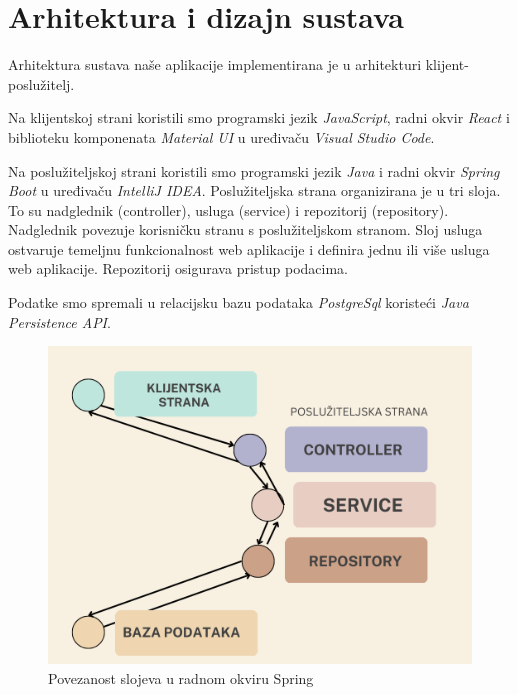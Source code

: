 \chapter{Arhitektura i dizajn sustava}
      
      {Arhitektura sustava naše aplikacije implementirana je u arhitekturi klijent-poslužitelj.}
       
      {Na klijentskoj strani koristili smo programski jezik \textit{JavaScript}, radni okvir \textit{React} i biblioteku komponenata \textit{Material UI} u uređivaču \textit{Visual Studio Code}.}
      
      {Na poslužiteljskoj strani koristili smo programski jezik \textit{Java} i radni okvir \textit{Spring Boot} u uređivaču \textit{IntelliJ IDEA}. Poslužiteljska strana organizirana je u tri sloja. To su nadglednik (controller), usluga (service) i repozitorij (repository). Nadglednik povezuje korisničku stranu s poslužiteljskom stranom. Sloj usluga ostvaruje temeljnu funkcionalnost web aplikacije i definira jednu ili više usluga web aplikacije. Repozitorij osigurava pristup podacima.}
      	
      {Podatke smo spremali u relacijsku bazu podataka \textit{PostgreSql} koristeći \textit{Java Persistence API}.} 
      
      
      \begin{figure}[H]
      	\includegraphics[scale=0.3]{slike/povezanostslojeva.PNG} %
      	\centering
      	\caption{Povezanost slojeva u radnom okviru Spring}
      	\label{fig:povezanostslojeva.png}
      \end{figure}
  
